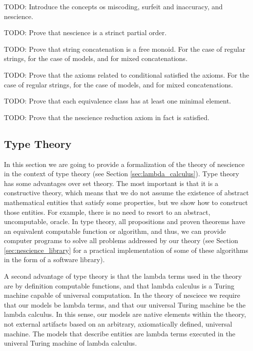 {\color{red} TODO: Introduce the concepts os miscoding, surfeit and inaccuracy, and nescience.}

{\color{red} TODO: Prove that nescience is a strinct partial order.}

{\color{red} TODO: Prove that string concatenation is a free monoid. For the case of regular strings, for the case of models, and for mixed concatenations.}

{\color{red} TODO: Prove that the axioms related to conditional satisfied the axioms. For the case of regular strings, for the case of models, and for mixed concatenations.}

{\color{red} TODO: Prove that each equivalence class has at least one minimal element.}

{\color{red} TODO: Prove that the nescience reduction axiom in fact is satisfied.}

%
%

\subsection{Type Theory}
\label{sub:ax_type_theory}

In this section we are going to provide a formalization of the theory of nescience in the context of type theory (see Section \ref{sec:lambda_calculus}). Type theory has some advantages over set theory. The most important is that it is a constructive theory, which means that we do not assume the existence of abstract mathematical entities that satisfy some properties, but we show how to construct those entities. For example, there is no need to resort to an abstract, uncomputable, oracle. In type theory, all propositions and proven theorems have an equivalent computable function or algorithm, and thus, we can provide computer programs to solve all problems addressed by our theory (see Section \ref{sec:nescience_library} for a practical implementation of some of these algorithms in the form of a software library).

A second advantage of type theory is that the lambda terms used in the theory are by definition computable functions, and that lambda calculus is a Turing machine capable of universal computation. In the theory of nesciece we require that our models be lambda terms, and that our universal Turing machine be the lambda calculus. In this sense, our models are native elements within the theory, not external artifacts based on an arbitrary, axiomatically defined, universal machine. The models that describe entities are lambda terms executed in the univeral Turing machine of lambda calculus.


